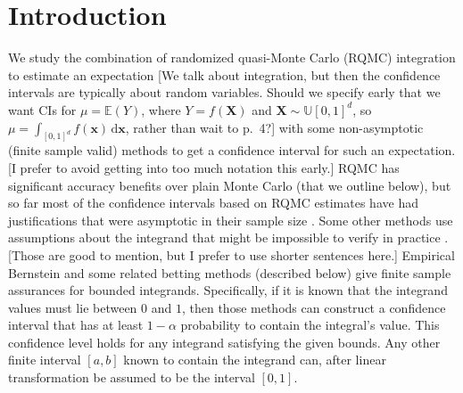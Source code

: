 \documentclass{article}
\newcommand{\art}[1]{\begingroup\color{blue}#1\endgroup}
\newcommand{\fred}[1]{\begingroup\color{red}#1\endgroup}
\begin{document}
\section{Introduction}

We study the combination of randomized quasi-Monte
Carlo (RQMC) integration \art{to estimate an expectation} \fred{[We talk about integration, but then the confidence intervals are typically about random variables.  Should we specify early that we want CIs for $\mu = \mathbb{E}(Y)$, where $Y = f(\boldsymbol{X})$ and $\boldsymbol{X} \sim \mathbb{U}[0,1]^d$, so $\mu = \int_{[0,1]^d} f(\boldsymbol{x}) \, \mathrm{d} \boldsymbol{x}$, rather than wait to p.\ 4?]} 
with some non-asymptotic \art{(finite sample valid)} methods
to get a confidence interval for such an expectation.
\art{[I prefer to avoid getting into too much notation this early.]}
RQMC has significant accuracy  benefits over plain Monte Carlo (that
we outline below), but so far most of the confidence intervals based on
RQMC estimates have had justifications that were asymptotic
in their sample size \fred{\cite{LEcEtal24a}. \art{Some other methods use} assumptions about the integrand that might be impossible to verify in practice \cite{HicJim16a,JimHic16a}}. \art{[Those are good to mention, but I prefer to use shorter sentences here.]} Empirical Bernstein and some related betting
methods (described below) give finite sample assurances for bounded integrands.  Specifically, if it is known that the integrand values must lie
between $0$ and $1$, then those methods can construct a confidence
interval that has at least $1-\alpha$ probability to contain
the integral's value.  This confidence level holds for any integrand
satisfying the given bounds.  Any other finite interval $[a,b]$ known
to contain the integrand can, after linear transformation
be assumed to be the interval $[0,1]$.
\end{document}
